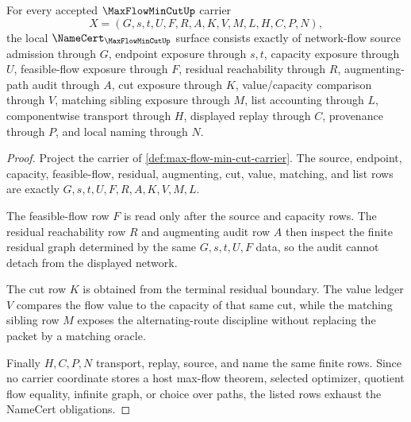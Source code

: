 \begin{theorem}
\label{thm:max-flow-min-cut-namecert-obligations}
For every accepted $\MaxFlowMinCutUp$ carrier
$$
X=(G,s,t,U,F,R,A,K,V,M,L,H,C,P,N),
$$
the local $\NameCert_{\MaxFlowMinCutUp}$ surface consists exactly of network-flow source admission through $G$, endpoint exposure through $s,t$, capacity exposure through $U$, feasible-flow exposure through $F$, residual reachability through $R$, augmenting-path audit through $A$, cut exposure through $K$, value/capacity comparison through $V$, matching sibling exposure through $M$, list accounting through $L$, componentwise transport through $H$, displayed replay through $C$, provenance through $P$, and local naming through $N$.
\end{theorem}
\begin{proof}
Project the carrier of \autoref{def:max-flow-min-cut-carrier}. The source, endpoint, capacity, feasible-flow, residual, augmenting, cut, value, matching, and list rows are exactly $G,s,t,U,F,R,A,K,V,M,L$.

The feasible-flow row $F$ is read only after the source and capacity rows. The residual reachability row $R$ and augmenting audit row $A$ then inspect the finite residual graph determined by the same $G,s,t,U,F$ data, so the audit cannot detach from the displayed network.

The cut row $K$ is obtained from the terminal residual boundary. The value ledger $V$ compares the flow value to the capacity of that same cut, while the matching sibling row $M$ exposes the alternating-route discipline without replacing the packet by a matching oracle.

Finally $H,C,P,N$ transport, replay, source, and name the same finite rows. Since no carrier coordinate stores a host max-flow theorem, selected optimizer, quotient flow equality, infinite graph, or choice over paths, the listed rows exhaust the NameCert obligations.
\end{proof}

